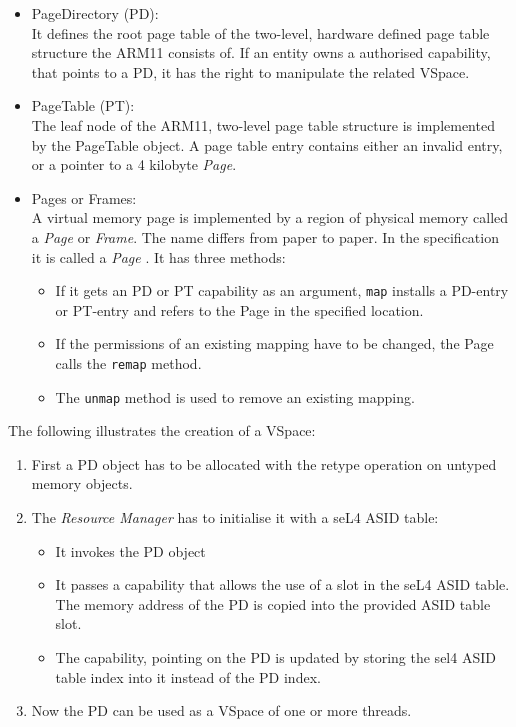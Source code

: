 \begin{itemize}
\begin{itemize}
\item PageDirectory (PD): \\
It defines the root page table of the two-level, hardware defined page table structure the ARM11 consists of. If an entity owns a authorised capability, that points to a PD, it has the right to manipulate the related VSpace.
\item PageTable (PT): \\
The leaf node of the ARM11, two-level page table structure is implemented by the PageTable object. A page table entry contains either an invalid entry, or a pointer to a 4 kilobyte \textit{Page}.
\item Pages or Frames: \\
A virtual memory page is implemented by a region of physical memory called a \textit{Page} or \textit{Frame}. The name differs from paper to paper. In the specification it is called a \textit{Page} \cite{sel4}. It has three methods:
\begin{itemize}
\item If it gets an PD or PT capability as an argument, \texttt{map} installs a PD-entry or PT-entry and refers to the Page in the specified location.
\item If the permissions of an existing mapping have to be changed, the Page calls the \texttt{remap} method.
\item The \texttt{unmap} method is used to remove an existing mapping.
\end{itemize}
\end{itemize}
The following illustrates the creation of a VSpace:
\begin{enumerate}
\item First a PD object has to be allocated with the retype operation on untyped memory objects. 
\item The \textit{Resource Manager} has to initialise it with a seL4 ASID table:
\begin{itemize}
\item It invokes the PD object
\item It passes a capability that allows the use of a slot in the seL4 ASID table. The memory address of the PD is copied into the provided ASID table slot. 
\item The capability, pointing on the PD is updated by storing the sel4 ASID table index into it instead of the PD index. 
\end{itemize}
\item Now the PD can be used as a VSpace of one or more threads.

\end{enumerate}
\end{itemize}
